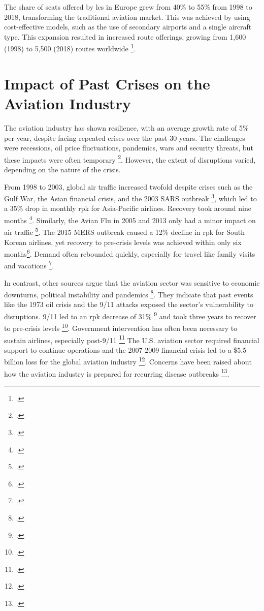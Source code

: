 \documentclass[12pt,onehalfspacing,headsepline,oneside,openright,a4paper, fleqn]{report}
\begin{document}
The share of seats offered by \gls{lcs} in Europe grew from 40\% to 55\% from 1998 to 2018, transforming the traditional aviation market. This was achieved by using cost-effective models, such as the use of secondary airports and a single aircraft type. This expansion resulted in increased route offerings, growing from 1,600 (1998) to 5,500 (2018) routes worldwide \footcite[75]{airbus2019}.

\section{Impact of Past Crises on the Aviation Industry}

The aviation industry has shown resilience, with an average growth rate of 5\% per year, despite facing repeated crises over the past 30 years. The challenges were recessions, oil price fluctuations, pandemics, wars and security threats, but these impacts were often temporary \footcite[6]{ADDEPALLI2018}. However, the extent of disruptions varied, depending on the nature of the crisis.

From 1998 to 2003, global air traffic increased twofold despite crises such as the Gulf War, the Asian financial crisis, and the 2003 SARS outbreak \footcite[11]{airbus2019}, which led to a 35\% drop in monthly \gls{rpk} for Asia-Pacific airlines. Recovery took around nine months \footcite{IATA2020a}. Similarly, the Avian Flu in 2005 and 2013 only had a minor impact on air traffic \footcite[3]{IACUS2020}. The 2015 MERS outbreak caused a 12\% decline in \gls{rpk} for South Korean airlines, yet recovery to pre-crisis levels was achieved within only six months\footcite[6]{ADDEPALLI2018}. Demand often rebounded quickly, especially for travel like family visits and vacations \footcite[14]{boeing2014}.

In contrast, other sources argue that the aviation sector was sensitive to economic downturns, political instability and pandemics \footcite{sadi2000, chung2015, dube2021b}. They indicate that past events like the 1973 oil crisis and the 9/11 attacks exposed the sector's vulnerability to disruptions. 9/11 led to an \gls{rpk} decrease of 31\% \footcite{Ito2005} and took three years to recover to pre-crisis levels \footcite{notis2012}. Government intervention has often been necessary to sustain airlines, especially post-9/11 \footcite{bailey2002, vig2004} The U.S. aviation sector required financial support to continue operations and the 2007-2009 financial crisis led to a \$5.5 billion loss for the global aviation industry \footcite{voltes2012}. Concerns have been raised about how the aviation industry is prepared for recurring disease outbreaks \footcite{hall2011}.
\end{document}
